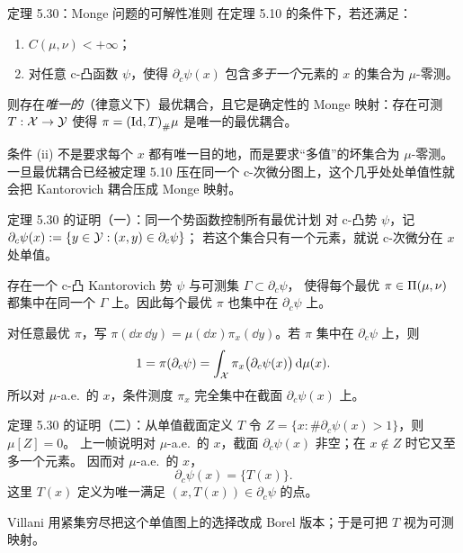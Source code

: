 \begin{frame}{定理 5.30：Monge 问题的可解性准则}
  在定理 5.10 的条件下，若还满足：
  \begin{enumerate}\small
    \item $C(\mu,\nu)<+\infty$；
    \item 对任意 c-凸函数 $\psi$，使得 $\partial_c\psi(x)$ 包含\emph{多于一个}元素的 $x$ 的集合为 $\mu$-零测。
  \end{enumerate}
  则存在\emph{唯一的}（律意义下）最优耦合，且它是确定性的 Monge 映射：存在可测 $T:\mathcal{X}\to\mathcal{Y}$ 使得
  $\pi={(\mathrm{Id},T)}_{\#}\mu$ 是唯一的最优耦合。

  条件 (ii) 不是要求每个 $x$ 都有唯一目的地，而是要求“多值”的坏集合为 $\mu$-零测。
  一旦最优耦合已经被定理 5.10 压在同一个 c-次微分图上，这个几乎处处单值性就会把 Kantorovich 耦合压成 Monge 映射。

\end{frame}

\begin{frame}{定理 5.30 的证明（一）：同一个势函数控制所有最优计划}
  对 c-凸势 $\psi$，记 $\partial_c\psi(x):=\{y\in\mathcal{Y}:(x,y)\in\partial_c\psi\}$；
  若这个集合只有一个元素，就说 c-次微分在 $x$ 处单值。\proofskipnote

  存在一个 c-凸 Kantorovich 势 $\psi$ 与可测集 $\Gamma\subset\partial_c\psi$，
  使得每个最优 $\pi\in\Pi(\mu,\nu)$ 都集中在同一个 $\Gamma$ 上。因此每个最优 $\pi$ 也集中在 $\partial_c\psi$ 上。

  对任意最优 $\pi$，写
  $\pi(\dd x\,\dd y)=\mu(\dd x)\pi_x(\dd y)$。若 $\pi$ 集中在 $\partial_c\psi$ 上，则
  \[
    1=\pi(\partial_c\psi)
    =\int_{\mathcal{X}}\pi_x\bigl(\partial_c\psi(x)\bigr)\,\mathrm{d}\mu(x).
  \]
  所以对 $\mu$-a.e.\ 的 $x$，条件测度 $\pi_x$ 完全集中在截面 $\partial_c\psi(x)$ 上。

\end{frame}

\begin{frame}{定理 5.30 的证明（二）：从单值截面定义 $T$}
  令 $Z=\{x:\#\partial_c\psi(x)>1\}$，则 $\mu[Z]=0$。\proofskipnote
  上一帧说明对 $\mu$-a.e.\ 的 $x$，截面 $\partial_c\psi(x)$ 非空；在 $x\notin Z$ 时它又至多一个元素。
  因而对 $\mu$-a.e.\ 的 $x$，
  \[
    \partial_c\psi(x)=\{T(x)\}.
  \]
  这里 $T(x)$ 定义为唯一满足 $(x,T(x))\in\partial_c\psi$ 的点。

  Villani 用紧集穷尽把这个单值图上的选择改成 Borel 版本；于是可把 $T$ 视为可测映射。

\end{frame}

